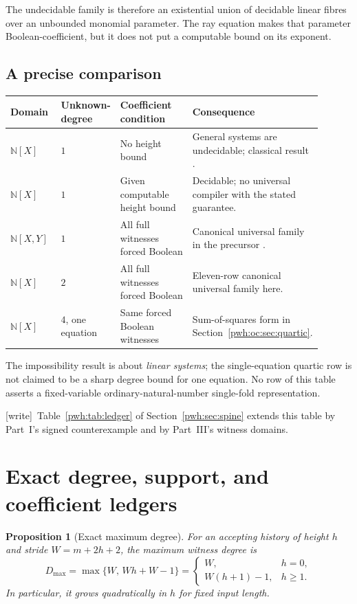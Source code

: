 \documentclass[11pt,letterpaper]{article}
\numberwithin{equation}{section}
\newtheorem{proposition}[theorem]{Proposition}
\theoremstyle{definition}
\newcommand{\N}{\mathbb N}
\newcommand{\wtag}{\textup{[write]}}
\begin{document}
The undecidable family is therefore an existential union of decidable
linear fibres over an unbounded monomial parameter. The ray equation
makes that parameter Boolean-coefficient, but it does not put a computable
bound on its exponent.

\subsection{A precise comparison}\label{pwh:oc:sec:comparison}

\begin{center}
\small
\begin{tabular}{@{}P{0.17\linewidth}P{0.16\linewidth}P{0.26\linewidth}P{0.31\linewidth}@{}}
\toprule
Domain & Unknown-degree & Coefficient condition & Consequence\\
\midrule
$\N[X]$ & $1$ & No height bound & General systems are undecidable; classical result \cite{oc:Narendran}.\\
$\N[X]$ & $1$ & Given computable height bound & Decidable; no universal compiler with the stated guarantee.\\
$\N[X,Y]$ & $1$ & All full witnesses forced Boolean & Canonical universal family in the precursor \cite{oc:Precursor}.\\
$\N[X]$ & $2$ & All full witnesses forced Boolean & Eleven-row canonical universal family here.\\
$\N[X]$ & $4$, one equation & Same forced Boolean witnesses & Sum-of-squares form in Section~\ref{pwh:oc:sec:quartic}.\\
\bottomrule
\end{tabular}
\end{center}

The impossibility result is about \emph{linear systems}; the single-equation
quartic row is not claimed to be a sharp degree bound for one equation.
No row of this table asserts a fixed-variable ordinary-natural-number
single-fold representation.

\wtag\ Table~\ref{pwh:tab:ledger} of Section~\ref{pwh:sec:spine} extends
this table by Part~I's signed counterexample and by Part~III's witness
domains.

\section{Exact degree, support, and coefficient ledgers}
\label{pwh:oc:sec:resources}

\begin{proposition}[Exact maximum degree]
\label{pwh:oc:prop:degree}
For an accepting history of height $h$ and stride $W=m+2h+2$, the maximum
witness degree is
\[
 D_{\max}=\max\{W,\,Wh+W-1\}
 =\begin{cases}W,&h=0,\\W(h+1)-1,&h\ge1.
 \end{cases}
\]
In particular, it grows quadratically in $h$ for fixed input length.
\end{proposition}
\end{document}
